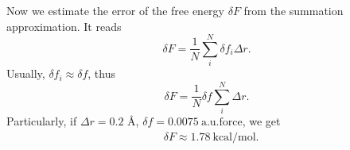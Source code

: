 Now we estimate the error of the free energy $\delta{F}$ from the summation approximation. It reads
\begin{equation}
  \delta{F} = \frac{1}{N}\sum_{i}^{N}\delta{f_i}{\Delta{r}}.
  \label{eq:dleta_f}
\end{equation}
Usually, $\delta{f_i}\approx\delta{f}$, thus
\begin{equation}
  \delta{F} = \frac{1}{N}\delta{f}\sum_{i}^{N}{\Delta{r}}.
\label{eq:dleta_f-2}
\end{equation}
Particularly, if $\Delta{r}= 0.2$ \AA, $\delta{f}=0.0075\ \text{a.u.force}$, we get 
\begin{equation}
\begin{split}
  &\delta{F} \approx 1.78\ \text{kcal/mol}.\nonumber
\end{split}
\label{eq:dleta_f-3}
\end{equation}

%
%
%

